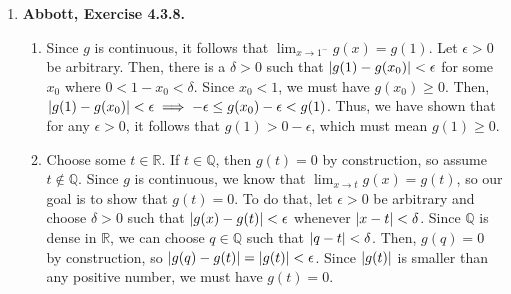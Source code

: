 \documentclass{article}
\DeclarePairedDelimiter\abs{\lvert}{\rvert}
\newcommand{\N}{\mathbb{N}}
\newcommand{\Q}{\mathbb{Q}}
\newcommand{\R}{\mathbb{R}}
\newcommand{\exc}[2][Abbott]{\item \textbf{#1, Exercise #2.}}
\newcommand{\lep}[1][L]{#1et $\epsilon > 0$ be arbitrary}
\begin{document}
\begin{enumerate}
\begin{enumerate}
        \item Let $x \in \Q$. It is clear that $t(x) > 0$. Now, construct a sequence $(x_n) \to x$ such that every $x_n$ is irrational. Then, $\lim t(x_n) = 0$, but $t(x) \neq 0$, so Corollary 4.3.3 guarantees that $t$ is not continuous at $x$.
        
        \item Let $x \notin \Q$ be arbitrary and let $(x_n) \to x$ be a sequence. We need to show that $\lim t(x_n) = t(x) = 0$. To do that, \lep[l] \space and assume for sake of contradiction that there are infinitely many $x_n$ such that $t(x_n) \geq \epsilon$. Then, we can form a subsequence $(x_{n_k})$ of $(x_n)$, which must also converge to $x$, consisting only of the terms in $(x_n)$ that satisfy $t(x_n) \geq \epsilon$. Since $\epsilon > 0$, none of the $x_{n_k}$ are irrational, which means they are all not equal to $x$. Then, we can write $x_{n_k} = p_k/q_k$ for each $k \in \N$, where $p_k, q_k$ are integers with $q_k > 0$. By Lemma (\ref{lem_rationalAproximations}), the sequence $(1/q_k)$ converges to zero. Thus, there is some $M \in \N$ such that $1/q_M < \epsilon$. But, by the construction of $(x_{n_k})$, $t(x_{n_M}) = t(p_M/q_M) = 1/q_M \geq \epsilon$, a contradiction.
        
        We can conclude that there are only finitely many $x_n$ for which $t(x_n) \geq \epsilon$. In other words, there is some $N \in \N$ such that $\abs{t(x_n)} = t(x_n) < \epsilon$ for all $n \geq N$, therefore $\lim t(x_n) = 0 = t(x)$, so $t$ is continuous at $x$.
    \end{enumerate}
    
    \exc{4.3.8}
    \begin{enumerate}
        \item Since $g$ is continuous, it follows that $\lim_{x \to 1^-} g(x) = g(1)$. \lep. Then, there is a $\delta > 0$ such that $\abs{g(1)-g(x_0)} < \epsilon$ for some $x_0$ where $0 < 1-x_0 < \delta$. Since $x_0 < 1$, we must have $g(x_0) \geq 0$. Then, $\abs{g(1)-g(x_0) } < \epsilon \implies -\epsilon \leq g(x_0)-\epsilon < g(1)$. Thus, we have shown that for any $\epsilon > 0$, it follows that $g(1) > 0 -\epsilon$, which must mean $g(1) \geq 0$.
        
        \item Choose some $t \in \R$. If $t \in \Q$, then $g(t) = 0$ by construction, so assume $t \notin \Q$. Since $g$ is continuous, we know that $\lim_{x \to t} g(x) = g(t)$, so our goal is to show that $g(t) = 0$. To do that, \lep[l] \space and choose $\delta > 0$ such that $\abs{g(x)-g(t)} < \epsilon$ whenever $\abs{x-t} < \delta$. Since $\Q$ is dense in $\R$, we can choose $q \in \Q$ such that $\abs{q-t} < \delta$. Then, $g(q) = 0$ by construction, so $\abs{g(q)-g(t)} = \abs{g(t)} < \epsilon$. Since $\abs{g(t)}$ is smaller than any positive number, we must have $g(t) = 0$.
        

\end{enumerate}
\end{enumerate}
\end{document}
